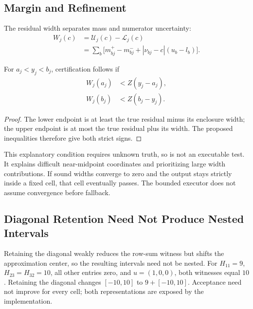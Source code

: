 \subsection{Margin and Refinement}
\label{app:margin-refinement}
The residual width separates mass and numerator uncertainty:
\begin{equation}
 \begin{aligned}
 W_j(c)&=\mathcal U_j(c)-\mathcal L_j(c)\\
 &=\sum_b\bigl[m^+_{bj}-m^-_{bj}+|\nu_{bj}-c|(u_b-l_b)\bigr].
 \end{aligned}
 \label{eq:residual-width}
\end{equation}
\begin{samepage}
\begin{proposition}\label{prop:margin-uncertainty}
For $a_j<y_j<b_j$, certification follows if
\begin{equation*}
 \begin{aligned}
 W_j(a_j)&<Z(y_j-a_j),\\
 W_j(b_j)&<Z(b_j-y_j).
 \end{aligned}
\end{equation*}
\end{proposition}
\end{samepage}
\begin{proof}
The lower endpoint is at least the true residual minus its enclosure width;
the upper endpoint is at most the true residual plus its width. The proposed
inequalities therefore give both strict signs.
\end{proof}
This explanatory condition requires unknown truth, so is not an executable
test. It explains difficult near-midpoint coordinates and prioritizing large
width contributions. If sound widths converge to zero and the output stays
strictly inside a fixed cell, that cell eventually passes. The bounded executor
does not assume convergence before fallback.

\FloatBarrier
\subsection{Diagonal Retention Need Not Produce Nested Intervals}
\label{app:diagonal-nonnesting}
Retaining the diagonal weakly reduces the row-sum witness but shifts the
approximation center, so the resulting intervals need not be nested.
For $H_{11}=9$, $H_{23}=H_{32}=10$, all other entries zero, and $u=(1,0,0)$,
both witnesses equal $10$. Retaining the diagonal changes $[-10,10]$ to
$9+[-10,10]$. Acceptance need not improve for every cell; both representations
are exposed by the implementation.

